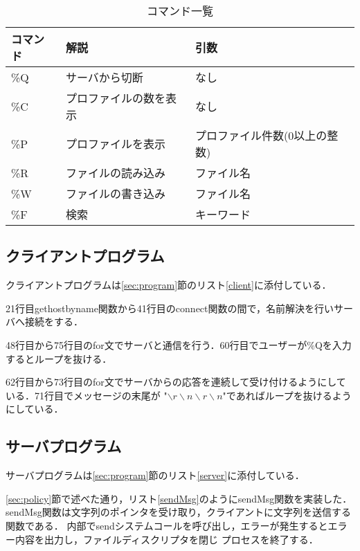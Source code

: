 \documentclass[11pt]{jarticle}
\begin{document}
\begin{table}[h] \caption{コマンド一覧} \label{table:command}
    \begin{center}
        \begin{tabular}{l|l|l} \hline
            コマンド & 解説 & 引数 \\ \hline \hline
            \%Q & サーバから切断 & なし \\ 
            \%C & プロファイルの数を表示 & なし \\ 
            \%P & プロファイルを表示 & プロファイル件数(0以上の整数) \\
            \%R & ファイルの読み込み & ファイル名 \\
            \%W & ファイルの書き込み & ファイル名 \\
            \%F & 検索 & キーワード \\ \hline
        \end{tabular}
    \end{center}
\end{table}

\subsection{クライアントプログラム}

クライアントプログラムは\ref{sec:program}節のリスト\ref{client}に添付している．

21行目gethostbyname関数から41行目のconnect関数の間で，名前解決を行いサーバへ接続をする．

48行目から75行目のfor文でサーバと通信を行う．60行目でユーザーが\%Qを入力するとループを抜ける．

62行目から73行目のfor文でサーバからの応答を連続して受け付けるようにしている．71行目でメッセージの末尾が
"$\backslash r\backslash n\backslash r\backslash n$"であればループを抜けるようにしている．

\subsection{サーバプログラム}

サーバプログラムは\ref{sec:program}節のリスト\ref{server}に添付している．

\ref{sec:policy}節で述べた通り，リスト\ref{sendMsg}のようにsendMsg関数を実装した．
sendMsg関数は文字列のポインタを受け取り，クライアントに文字列を送信する関数である．
内部でsendシステムコールを呼び出し，エラーが発生するとエラー内容を出力し，ファイルディスクリプタを閉じ
プロセスを終了する．
\end{document}
